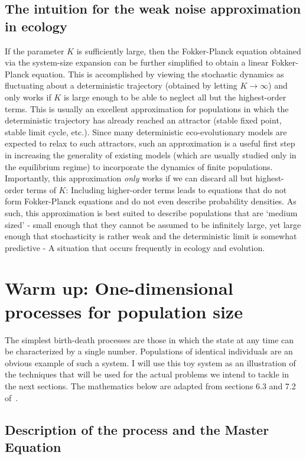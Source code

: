 \subsection{The intuition for the weak noise approximation in ecology}
If the parameter $K$ is sufficiently large, then the Fokker-Planck equation obtained via the system-size expansion can be further simplified to obtain a linear Fokker-Planck equation. This is accomplished by viewing the stochastic dynamics as fluctuating about a deterministic trajectory (obtained by letting $K \to \infty$) and only works if $K$ is large enough to be able to neglect all but the highest-order terms. This is usually an excellent approximation for populations in which the deterministic trajectory has already reached an attractor (stable fixed point, stable limit cycle, etc.). Since many deterministic eco-evolutionary models are expected to relax to such attractors, such an approximation is a useful first step in increasing the generality of existing models (which are usually studied only in the equilibrium regime) to incorporate the dynamics of finite populations. Importantly, this approximation \emph{only} works if we can discard all but highest-order terms of $K$: Including higher-order terms leads to equations that do not form Fokker-Planck equations and do not even describe probability densities. As such, this approximation is best suited to describe populations that are `medium sized' - small enough that they cannot be assumed to be infinitely large, yet large enough that stochasticity is rather weak and the deterministic limit is somewhat predictive - A situation that occurs frequently in ecology and evolution.

\section{Warm up: One-dimensional processes for population size}\label{sec_1D_processes}
The simplest birth-death processes are those in which the state at any time can be characterized by a single number. Populations of identical individuals are an obvious example of such a system. I will use this toy system as an illustration of the techniques that will be used for the actual problems we intend to tackle in the next sections. The mathematics below are adapted from sections 6.3 and 7.2 of~\cite{gardiner_stochastic_2009}.

\subsection{Description of the process and the Master Equation}

